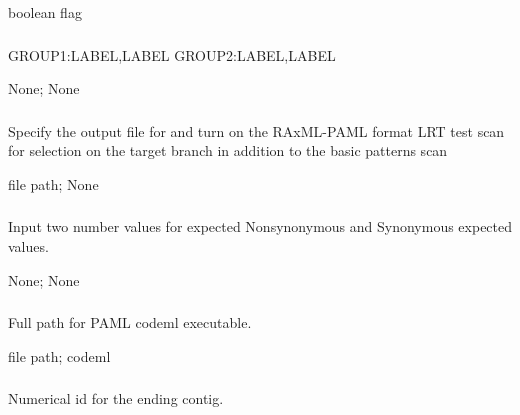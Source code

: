 \documentclass[letterpaper,11pt,english]{sphinxmanual}
\begin{document}
 boolean flag


\subsubsection{}
\label{\detokenize{prog_desc:allele-groups-allelegroups}}
 GROUP1:LABEL,LABEL GROUP2:LABEL,LABEL

 None;  None


\subsubsection{}
\label{\detokenize{prog_desc:branch-lrt-branchlrt}}
 Specify the output file for and turn on the RAxML-PAML format LRT test scan for selection on the target branch in addition to the basic patterns scan

 file path;  None


\subsubsection{}
\label{\detokenize{prog_desc:chi-test-chitest}}
 Input two number values for expected Nonsynonymous and Synonymous expected values.

 None;  None


\subsubsection{}
\label{\detokenize{prog_desc:codeml-path-codemlpath}}
 Full path for PAML codeml executable.

 file path;  codeml


\subsubsection{}
\label{\detokenize{prog_desc:end-contig-endcontig}}
 Numerical id for the ending contig.
\end{document}
